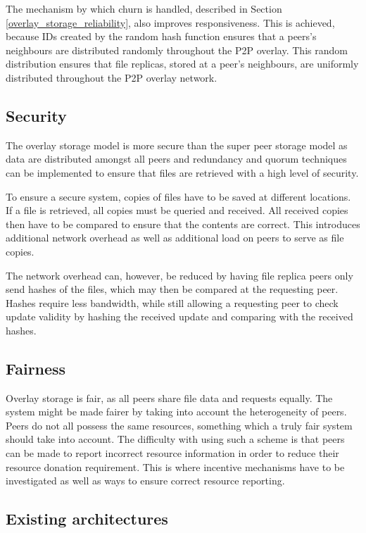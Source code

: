 The mechanism by which churn is handled, described in Section \ref{overlay_storage_reliability}, also improves responsiveness.  This is achieved, because IDs created by the random hash function ensures that a peers's neighbours are distributed randomly throughout the P2P overlay. This random distribution ensures that file replicas, stored at a peer's neighbours, are uniformly distributed throughout the P2P overlay network.


\subsection{Security}
The overlay storage model is more secure than the super peer storage model as data are distributed amongst all peers and redundancy and quorum techniques can be implemented to ensure that files are retrieved with a high level of security.

To ensure a secure system, copies of files have to be saved at different locations. If a file is retrieved, all copies must be queried and received. All received copies then have to be compared to ensure that the contents are correct. This introduces additional network overhead as well as additional load on peers to serve as file copies.

The network overhead can, however, be reduced by having file replica peers only send hashes of the files, which may then be compared at the requesting peer. Hashes require less bandwidth, while still allowing a requesting peer to check update validity by hashing the received update and comparing with the received hashes.

\subsection{Fairness}

Overlay storage is fair, as all peers share file data and requests equally. The system might be made fairer by taking into account the heterogeneity of peers. Peers do not all possess the same resources, something which a truly fair system should take into account. The difficulty with using such a scheme is that peers can be made to report incorrect resource information in order to reduce their resource donation requirement. This is where incentive mechanisms have to be investigated as well as ways to ensure correct resource reporting.

\subsection{Existing architectures}

